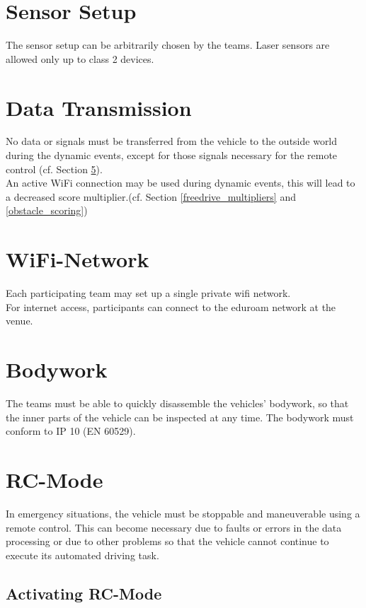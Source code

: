 \section{Sensor Setup}

The sensor setup can be arbitrarily chosen by the teams. Laser sensors are
allowed only up to class 2 devices.

\section{Data Transmission}

No data or signals must be transferred from the vehicle to the outside world
during the dynamic events, except for those signals necessary for the remote
control (cf. Section \ref{rc_mode}).\\ An active WiFi connection may be used
during dynamic events, this will lead to a decreased score multiplier.(cf.
Section \ref{freedrive_multipliers} and \ref{obstacle_scoring})

\section{WiFi-Network}

Each participating team may set up a single private wifi network.\\
For internet access, participants can connect to the eduroam network at the venue.\\

\section{Bodywork}

The teams must be able to quickly disassemble the vehicles’ bodywork, so that
the inner parts of the vehicle can be inspected at any time. The bodywork must
conform to IP 10 (EN 60529).

\section{RC-Mode}
\label{rc_mode}

In emergency situations, the vehicle must be stoppable and maneuverable using a
remote control. This can become necessary due to faults or errors in the data
processing or due to other problems so that the vehicle cannot continue to
execute its automated driving task.

\subsection{Activating RC-Mode}

